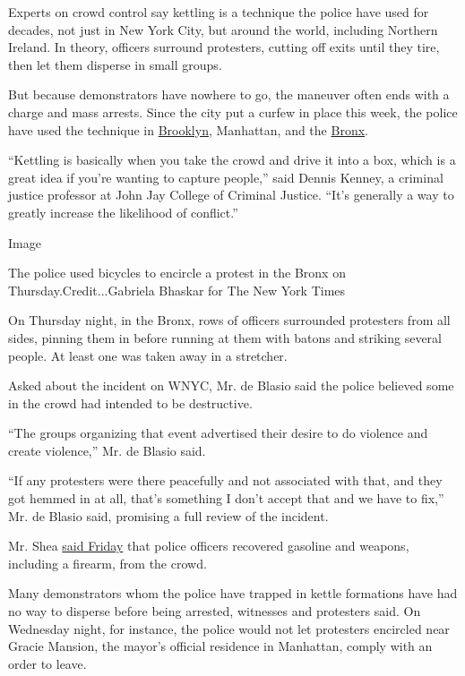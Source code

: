 Experts on crowd control say kettling is a technique the police have
used for decades, not just in New York City, but around the world,
including Northern Ireland. In theory, officers surround protesters,
cutting off exits until they tire, then let them disperse in small
groups.

But because demonstrators have nowhere to go, the maneuver often ends
with a charge and mass arrests. Since the city put a curfew in place
this week, the police have used the technique in
\href{https://www.nytimes3xbfgragh.onion/interactive/2020/06/04/burst/brooklyn-protesters-police-confrontation.html}{Brooklyn},
Manhattan, and the
\href{https://www.nytimes3xbfgragh.onion/2020/06/04/nyregion/nyc-protests-george-floyd.html}{Bronx}.

``Kettling is basically when you take the crowd and drive it into a box,
which is a great idea if you're wanting to capture people,'' said Dennis
Kenney, a criminal justice professor at John Jay College of Criminal
Justice. ``It's generally a way to greatly increase the likelihood of
conflict.''

Image

The police used bicycles to encircle a protest in the Bronx on
Thursday.Credit...Gabriela Bhaskar for The New York Times

On Thursday night, in the Bronx, rows of officers surrounded protesters
from all sides, pinning them in before running at them with batons and
striking several people. At least one was taken away in a stretcher.

Asked about the incident on WNYC, Mr. de Blasio said the police believed
some in the crowd had intended to be destructive.

``The groups organizing that event advertised their desire to do
violence and create violence,'' Mr. de Blasio said.

``If any protesters were there peacefully and not associated with that,
and they got hemmed in at all, that's something I don't accept that and
we have to fix,'' Mr. de Blasio said, promising a full review of the
incident.

Mr. Shea
\href{https://nypost.com/2020/06/05/nypd-commissioner-says-violent-nyc-protest-was-only-about-mayhem/}{said
Friday} that police officers recovered gasoline and weapons, including a
firearm, from the crowd.

Many demonstrators whom the police have trapped in kettle formations
have had no way to disperse before being arrested, witnesses and
protesters said. On Wednesday night, for instance, the police would not
let protesters encircled near Gracie Mansion, the mayor's official
residence in Manhattan, comply with an order to leave.

